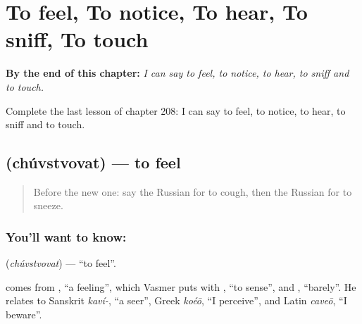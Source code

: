 
\chapter{To feel, To notice, To hear, To sniff, To touch}
\label{ch:ru-to-feel-to-notice-to-hear-to-sniff-to-touch}

\begin{chapteropening}
\textbf{By the end of this chapter:} \emph{I can say to feel, to notice, to hear, to sniff and to touch.}

Complete the last lesson of chapter 208: I can say to feel, to notice, to hear, to sniff and to touch.
\end{chapteropening}

\section[\texorpdfstring{\ru{чувствовать} (chúvstvovat)}{чувствовать (chúvstvovat)}]{ (chúvstvovat) — to feel}

\label{lesson:RU-C208-chuvstvovat}



\begin{quote}
Before the new one: say the Russian for to cough, then the Russian for to sneeze.
\end{quote}

\subsection*{You'll want to know: }
\textbf{} (\emph{chúvstvovat}) — \textquotedblleft{}to feel\textquotedblright{}.

\begin{cousinweb}
\textbf{} comes from \emph{}, \textquotedblleft{}a feeling\textquotedblright{}, which Vasmer puts with \emph{}, \textquotedblleft{}to sense\textquotedblright{}, and \emph{}, \textquotedblleft{}barely\textquotedblright{}. He relates \emph{} to Sanskrit \emph{kaví-}, \textquotedblleft{}a seer\textquotedblright{}, Greek \emph{koéō}, \textquotedblleft{}I perceive\textquotedblright{}, and Latin \emph{caveō}, \textquotedblleft{}I beware\textquotedblright{}.
\end{cousinweb}

